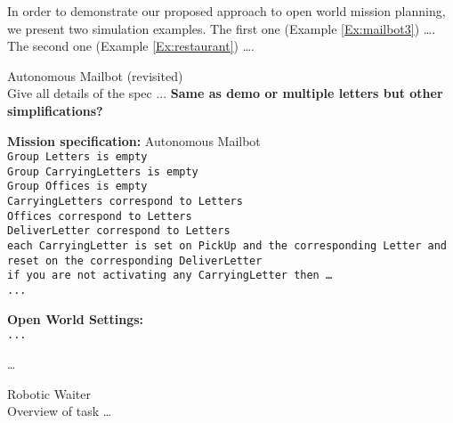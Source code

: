 In order to demonstrate our proposed approach to open world mission planning, we present two simulation examples. The first one (Example \ref{Ex:mailbot3}) \ldots. The second one (Example \ref{Ex:restaurant}) \ldots.

\begin{myExample}\label{Ex:mailbot3} Autonomous Mailbot (revisited)\\
	Give all details of the spec ... \textbf{Same as demo or multiple letters but other simplifications?}
\end{myExample}

\begin{algorithm}
	\textbf{Mission specification:} Autonomous Mailbot\\
	{\small
	\texttt{Group Letters is empty}\\
	\texttt{Group CarryingLetters is empty}\\
	\texttt{Group Offices is empty}\\
	
	\texttt{CarryingLetters correspond to Letters}\\
	\texttt{Offices correspond to Letters}\\
	\texttt{DeliverLetter correspond to Letters}\\
	
	\texttt{each CarryingLetter is set on PickUp and the corresponding Letter and reset on the corresponding DeliverLetter}\\
	
	\texttt{if you are not activating any CarryingLetter then \ldots}\\
	\texttt{...}\\
	}
	
	\textbf{Open World Settings:}\\
	{\small
	\texttt{...} 
	}
\end{algorithm}

\ldots

\begin{myExample}\label{Ex:restaurant} Robotic Waiter \\
	Overview of task \ldots
\end{myExample}

